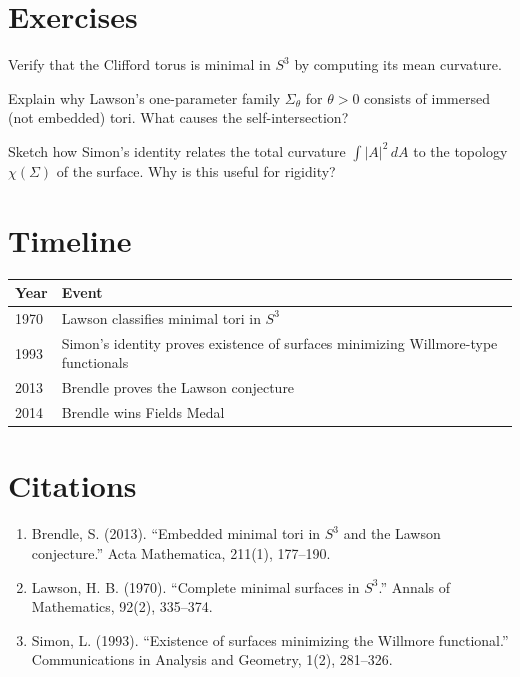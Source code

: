 \section{Exercises}

\begin{exercise}[Basic]
Verify that the Clifford torus is minimal in $S^3$ by computing its mean curvature.
\end{exercise}

\begin{exercise}[Intermediate]
Explain why Lawson's one-parameter family $\Sigma_\theta$ for $\theta > 0$ consists of immersed (not embedded) tori. What causes the self-intersection?
\end{exercise}

\begin{exercise}[Challenge]
Sketch how Simon's identity relates the total curvature $\int |A|^2 \, dA$ to the topology $\chi(\Sigma)$ of the surface. Why is this useful for rigidity?
\end{exercise}

\section{Timeline}

\begin{tabularx}{\linewidth}{lX}
\toprule
\textbf{Year} & \textbf{Event} \\ \midrule
1970 & Lawson classifies minimal tori in $S^3$ \\ 
1993 & Simon's identity proves existence of surfaces minimizing Willmore-type functionals \\
2013 & Brendle proves the Lawson conjecture \\
2014 & Brendle wins Fields Medal \\ \bottomrule
\end{tabularx}

\section{Citations}

\begin{enumerate}
\item Brendle, S. (2013). ``Embedded minimal tori in $S^3$ and the Lawson conjecture.'' Acta Mathematica, 211(1), 177--190.
\item Lawson, H. B. (1970). ``Complete minimal surfaces in $S^3$.'' Annals of Mathematics, 92(2), 335--374.
\item Simon, L. (1993). ``Existence of surfaces minimizing the Willmore functional.'' Communications in Analysis and Geometry, 1(2), 281--326.
\end{enumerate}
